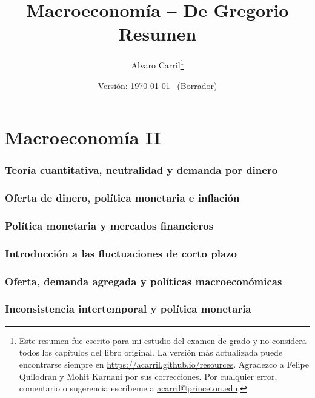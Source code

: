 \documentclass[11pt,twoside]{article}
\title{\textsf{Macroeconomía} -- De Gregorio \\ \Large{Resumen}}
\author{Alvaro Carril\thanks{Este resumen fue escrito para mi estudio del examen de grado y no considera todos los capítulos del libro original. La versión más actualizada puede encontrarse siempre en \url{https://acarril.github.io/resources}. Agradezco a Felipe Quilodran y Mohit Karnani por sus correcciones. Por cualquier error, comentario o sugerencia escríbeme a \url{acarril@princeton.edu}.}}
\date{\small Versión: \today~ (Borrador)}
\numberwithin{equation}{section}
\numberwithin{figure}{section}
\begin{document}
\maketitle
\thispagestyle{empty}
\setcounter{tocdepth}{1}
\makeatletter
{}
\makeatother
\newpage

\newpage
\setcounter{section}{2}
\newpage

\newpage

\newpage

\newpage

\newpage

\newpage

\newpage

\setcounter{section}{10}
\newpage



\setcounter{section}{14}
\part*{Macroeconomía II}
\section{Teoría cuantitativa, neutralidad y demanda por dinero}
\section{Oferta de dinero, política monetaria e inflación}
\section{Política monetaria y mercados financieros}
\section{Introducción a las fluctuaciones de corto plazo}
\newpage

\newpage

\newpage

\newpage
\section{Oferta, demanda agregada y políticas macroeconómicas}
\setcounter{section}{24}
\section{Inconsistencia intertemporal y política monetaria}
\end{document}
